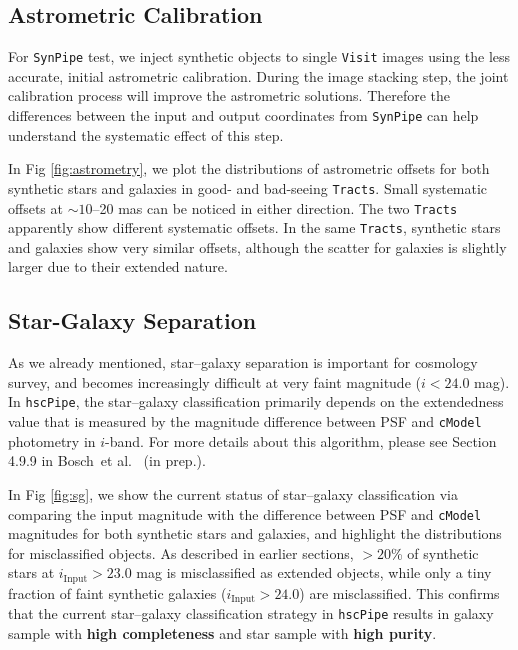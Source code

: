 \documentclass[useamsfonts]{pasj01}
\def\etal{{\ et al.~}}
\def\hscpipe{\texttt{hscPipe}}
\def\synpipe{\texttt{SynPipe}}
\def\cmodel{\texttt{cModel}}
\def\visit{\texttt{Visit}}
\def\tracts{\texttt{Tracts}}
\begin{document}
\subsection{Astrometric Calibration}
    \label{ssec:astrometry}
    
    For \synpipe{} test, we inject synthetic objects to single \visit{} images using 
    the less accurate, initial astrometric calibration. 
    During the image stacking step, the joint calibration process will improve the 
    astrometric solutions. 
    Therefore the differences between the input and output coordinates from \synpipe{}
    can help understand the systematic effect of this step. 
    
    In Fig \ref{fig:astrometry}, we plot the distributions of astrometric offsets for 
    both synthetic stars and galaxies in good- and bad-seeing \tracts{}. 
    Small systematic offsets at ${\sim}10$--20 mas can be noticed in either direction. 
    The two \tracts{} apparently show different systematic offsets. 
    In the same \tracts{}, synthetic stars and galaxies show very similar offsets, 
    although the scatter for galaxies is slightly larger due to their extended nature.
    
\subsection{Star-Galaxy Separation}
    \label{ssec:sg}
    
    As we already mentioned, star--galaxy separation is important for cosmology survey,
    and becomes increasingly difficult at very faint magnitude ($i<24.0$ mag). 
    In \hscpipe{}, the star--galaxy classification primarily depends on the extendedness 
    value that is measured by the magnitude difference between PSF and \cmodel{} 
    photometry in $i$-band. 
    For more details about this algorithm, please see Section 4.9.9 in Bosch\etal 
    (in prep.). 
    
    In Fig \ref{fig:sg}, we show the current status of star--galaxy classification  
    via comparing the input magnitude with the difference between PSF and \cmodel{} 
    magnitudes for both synthetic stars and galaxies, and highlight the distributions 
    for misclassified objects. 
    As described in earlier sections, $>20$\% of synthetic stars at 
    $i_{\mathrm{Input}}>23.0$ mag is misclassified as extended objects, while only a 
    tiny fraction of faint synthetic galaxies ($i_{\mathrm{Input}}>24.0$) are 
    misclassified. 
    This confirms that the current star--galaxy classification strategy in \hscpipe{}
    results in galaxy sample with \textbf{high completeness} and star sample 
    with \textbf{high purity}.
    
\end{document}
